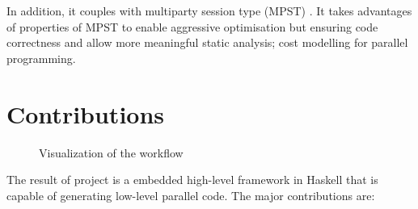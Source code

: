 In addition, it couples with multiparty session type (MPST) \cite{coppoGentleIntroductionMultiparty2015}. It takes advantages of properties of MPST to enable aggressive optimisation but ensuring code correctness and allow more meaningful static analysis; \eg cost modelling for parallel programming. %
\section{Contributions} 
\begin{figure}[ht]
    \centering
    \caption{Visualization of the workflow}
    \label{intro:fig:workflow}
\end{figure}
The result of project is a embedded high-level framework in Haskell that is capable of generating low-level parallel code. The major contributions are:
